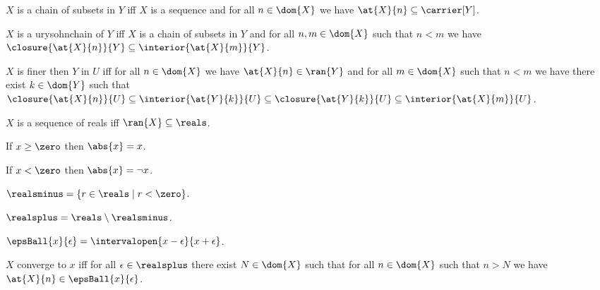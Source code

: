 \begin{definition}\label{chain_of_subsets}
    $X$ is a chain of subsets in $Y$ iff $X$ is a sequence and for all $n \in \dom{X}$ we have $\at{X}{n} \subseteq \carrier[Y]$. 
\end{definition}


\begin{definition}\label{urysohnchain}%
    $X$ is a urysohnchain of $Y$ iff $X$ is a chain of subsets in $Y$ and for all $n,m \in \dom{X}$ such that $n < m$ we have $\closure{\at{X}{n}}{Y} \subseteq \interior{\at{X}{m}}{Y}$.
\end{definition}


\begin{definition}\label{finer} %
    $X$ is finer then $Y$ in $U$ iff for all $n \in \dom{X}$ we have $\at{X}{n} \in \ran{Y}$ and for all $m \in \dom{X}$ such that $n < m$ we have there exist $k \in \dom{Y}$ such that $ \closure{\at{X}{n}}{U} \subseteq \interior{\at{Y}{k}}{U} \subseteq \closure{\at{Y}{k}}{U} \subseteq \interior{\at{X}{m}}{U}$.
\end{definition}


\begin{definition}\label{sequence_of_reals}
    $X$ is a sequence of reals iff $\ran{X} \subseteq \reals$.
\end{definition}


\begin{axiom}\label{abs_behavior1}
    If $x \geq \zero$ then $\abs{x} = x$.
\end{axiom}

\begin{axiom}\label{abs_behavior2}
    If $x < \zero$ then $\abs{x} = \neg{x}$.
\end{axiom}

\begin{definition}\label{realsminus}
    $\realsminus = \{r \in \reals \mid r < \zero\}$.
\end{definition}

\begin{definition}\label{realsplus}
    $\realsplus = \reals \setminus \realsminus$.
\end{definition}

\begin{definition}\label{epsilon_ball}
    $\epsBall{x}{\epsilon} = \intervalopen{x-\epsilon}{x+\epsilon}$.
\end{definition}

\begin{definition}\label{pointwise_convergence}
    $X$ converge to $x$ iff for all $\epsilon \in \realsplus$ there exist $N \in \dom{X}$ such that for all $n \in \dom{X}$ such that $n > N$ we have $\at{X}{n} \in \epsBall{x}{\epsilon}$.
\end{definition}












